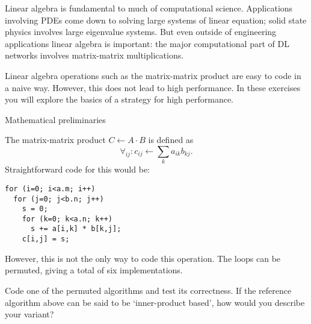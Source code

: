 
Linear algebra is fundamental to much of computational science.
Applications involving \acp{PDE} come down to solving large
systems of linear equation; solid state physics involves
large eigenvalue systems.
But even outside of engineering applications linear algebra is important:
the major computational part of \ac{DL} networks involves matrix-matrix multiplications.

Linear algebra operations such as the matrix-matrix product are easy
to code in a naive way. However, this does not lead to high
performance. In these exercises you will explore the basics of a
strategy for high performance.

 {Mathematical preliminaries}

The matrix-matrix product $C\leftarrow A\cdot B$ is defined as
\[ \forall_{ij}\colon c_{ij}\leftarrow \sum_k a_{ik}b_{kj}. \]
Straightforward code for this would be:
\begin{lstlisting}
for (i=0; i<a.m; i++)
  for (j=0; j<b.n; j++)
    s = 0;
    for (k=0; k<a.n; k++)
      s += a[i,k] * b[k,j];
    c[i,j] = s;
\end{lstlisting}
However, this is not the only way to code this operation.
The loops can be permuted, giving a total of six implementations.

\begin{exercise}
  Code one of the permuted algorithms and test its correctness. If the
  reference algorithm above can be said to be `inner-product based',
  how would you describe your variant?
\end{exercise}


